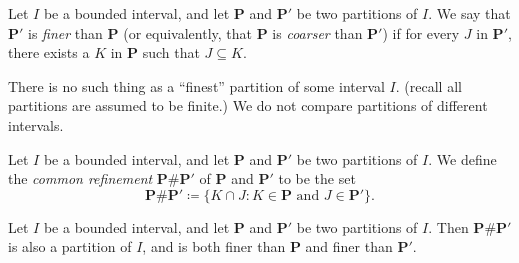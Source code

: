 \begin{definition}\label{11.1.14}
    Let \(I\) be a bounded interval, and let \(\mathbf{P}\) and \(\mathbf{P}'\) be two partitions of \(I\).
    We say that \(\mathbf{P}'\) is \emph{finer} than \(\mathbf{P}\) (or equivalently, that \(\mathbf{P}\) is \emph{coarser} than \(\mathbf{P}'\)) if for every \(J\) in \(\mathbf{P}'\), there exists a \(K\) in \(\mathbf{P}\) such that \(J \subseteq K\).
\end{definition}

\begin{note}
    There is no such thing as a ``finest'' partition of some interval \(I\).
    (recall all partitions are assumed to be finite.)
    We do not compare partitions of different intervals.
\end{note}

\setcounter{theorem}{15}
\begin{definition}\label{11.1.16}
    Let \(I\) be a bounded interval, and let \(\mathbf{P}\) and \(\mathbf{P}'\) be two partitions of \(I\).
    We define the \emph{common refinement} \(\mathbf{P} \# \mathbf{P}'\) of \(\mathbf{P}\) and \(\mathbf{P}'\) to be the set
    \[
        \mathbf{P} \# \mathbf{P}' \coloneqq \{K \cap J : K \in \mathbf{P} \text{ and } J \in \mathbf{P}'\}.
    \]
\end{definition}

\setcounter{theorem}{17}
\begin{lemma}\label{11.1.18}
    Let \(I\) be a bounded interval, and let \(\mathbf{P}\) and \(\mathbf{P}'\) be two partitions of \(I\).
    Then \(\mathbf{P} \# \mathbf{P}'\) is also a partition of \(I\), and is both finer than \(\mathbf{P}\) and finer than \(\mathbf{P}'\).
\end{lemma}

